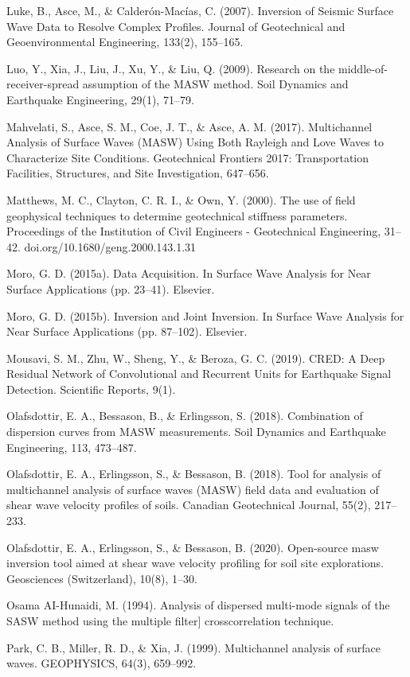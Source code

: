 Luke, B., Asce, M., \& Calderón-Macías, C. (2007). Inversion of Seismic Surface Wave Data to Resolve Complex Profiles. Journal of Geotechnical and Geoenvironmental Engineering, 133(2), 155–165. 

Luo, Y., Xia, J., Liu, J., Xu, Y., \& Liu, Q. (2009). Research on the middle-of-receiver-spread assumption of the MASW method. Soil Dynamics and Earthquake Engineering, 29(1), 71–79. 

Mahvelati, S., Asce, S. M., Coe, J. T., \& Asce, A. M. (2017). Multichannel Analysis of Surface Waves (MASW) Using Both Rayleigh and Love Waves to Characterize Site Conditions. Geotechnical Frontiers 2017: Transportation Facilities, Structures, and Site Investigation, 647–656. 

Matthews, M. C., Clayton, C. R. I., \& Own, Y. (2000). The use of field geophysical techniques to determine geotechnical stiffness parameters. Proceedings of the Institution of Civil Engineers - Geotechnical Engineering, 31–42. doi.org/10.1680/geng.2000.143.1.31

Moro, G. D. (2015a). Data Acquisition. In Surface Wave Analysis for Near Surface Applications (pp. 23–41). Elsevier. 

Moro, G. D. (2015b). Inversion and Joint Inversion. In Surface Wave Analysis for Near Surface Applications (pp. 87–102). Elsevier. 

Mousavi, S. M., Zhu, W., Sheng, Y., \& Beroza, G. C. (2019). CRED: A Deep Residual Network of Convolutional and Recurrent Units for Earthquake Signal Detection. Scientific Reports, 9(1). 

Olafsdottir, E. A., Bessason, B., \& Erlingsson, S. (2018). Combination of dispersion curves from MASW measurements. Soil Dynamics and Earthquake Engineering, 113, 473–487. 

Olafsdottir, E. A., Erlingsson, S., \& Bessason, B. (2018). Tool for analysis of multichannel analysis of surface waves (MASW) field data and evaluation of shear wave velocity profiles of soils. Canadian Geotechnical Journal, 55(2), 217–233.

Olafsdottir, E. A., Erlingsson, S., \& Bessason, B. (2020). Open-source masw inversion tool aimed at shear wave velocity profiling for soil site explorations. Geosciences (Switzerland), 10(8), 1–30. 

Osama AI-Hunaidi, M. (1994). Analysis of dispersed multi-mode signals of the SASW method using the multiple filter] crosscorrelation technique.

Park, C. B., Miller, R. D., \& Xia, J. (1999). Multichannel analysis of surface waves. GEOPHYSICS, 64(3), 659–992. 


